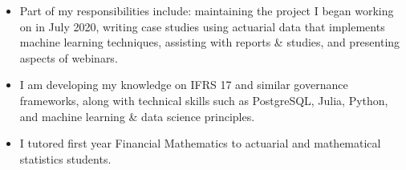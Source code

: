 \documentclass[10pt,a4paper]{altacv}
\begin{document}

%

\begin{fullwidth}
%
\makecvheader
%
\end{fullwidth}

%







\begin{itemize}
    \setlength{\itemindent}{0.5em}
  \item \small{Part of my responsibilities include: maintaining the project I began working on in July 2020, writing case studies using actuarial data that implements machine learning techniques, assisting with reports \& studies, and presenting aspects of webinars.}
  \item \small{I am developing my knowledge on IFRS 17 and similar governance frameworks, along with technical skills such as PostgreSQL, Julia, Python, and machine learning \& data science principles.}
\end{itemize}
\medskip



\begin{itemize}
    \setlength{\itemindent}{0.5em}
  \item \small{I tutored first year Financial Mathematics to actuarial and mathematical statistics students.}
\end{itemize}
\end{document}
